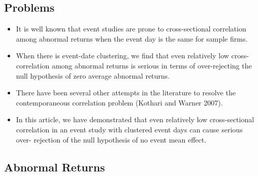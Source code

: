 \documentclass[12pt]{article}
\begin{document}
\subsection{Problems}

    \begin{itemize}

        \item It is well known that event studies are prone to cross-sectional correlation among abnormal returns when the event day is the same for sample firms. \citep{Kolari2010}

        \item When there is event-date clustering, we find that even relatively low cross-correlation among abnormal returns is serious in terms of over-rejecting the null hypothesis of zero average abnormal returns. \citep{Kolari2010}

        \item There have been several other attempts in the literature to resolve the contemporaneous correlation problem (Kothari and Warner 2007).\citep{Kolari2010}

        \item In this article, we have demonstrated that even relatively low cross-sectional correlation in an event study with clustered event days can cause serious over- rejection of the null hypothesis of no event mean effect. \citep{Kolari2010}

    \end{itemize}

\subsection{Abnormal Returns}
\end{document}

